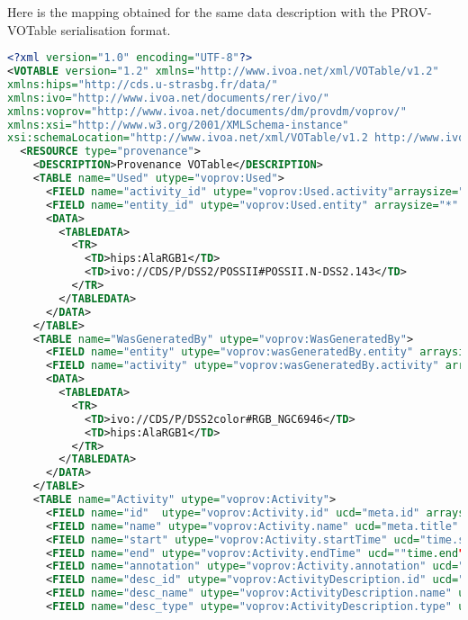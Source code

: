 Here is the mapping obtained for the same data description with the PROV-VOTable serialisation format.

\begin{lstlisting}[language=XML, caption= PROV-VOTable serialisation example for a color composition activity]
<?xml version="1.0" encoding="UTF-8"?>
<VOTABLE version="1.2" xmlns="http://www.ivoa.net/xml/VOTable/v1.2" 
xmlns:hips="http://cds.u-strasbg.fr/data/" 
xmlns:ivo="http://www.ivoa.net/documents/rer/ivo/" 
xmlns:voprov="http://www.ivoa.net/documents/dm/provdm/voprov/" 
xmlns:xsi="http://www.w3.org/2001/XMLSchema-instance" 
xsi:schemaLocation="http://www.ivoa.net/xml/VOTable/v1.2 http://www.ivoa.net/xml/VOTable/VOTable-1.2.xsd">
  <RESOURCE type="provenance">
    <DESCRIPTION>Provenance VOTable</DESCRIPTION>
    <TABLE name="Used" utype="voprov:Used">
      <FIELD name="activity_id" utype="voprov:Used.activity"arraysize="*" ucd="meta.id" datatype="char" />
      <FIELD name="entity_id" utype="voprov:Used.entity" arraysize="*" ucd="meta.id" datatype="char" />
      <DATA>
        <TABLEDATA>
          <TR>
            <TD>hips:AlaRGB1</TD>
            <TD>ivo://CDS/P/DSS2/POSSII#POSSII.N-DSS2.143</TD>
          </TR>
        </TABLEDATA>
      </DATA>
    </TABLE>
    <TABLE name="WasGeneratedBy" utype="voprov:WasGeneratedBy">
      <FIELD name="entity" utype="voprov:wasGeneratedBy.entity" arraysize="*" datatype="char"  ucd="meta.id"/>
      <FIELD name="activity" utype="voprov:wasGeneratedBy.activity" arraysize="*" datatype="char" ucd="meta.id"/>
      <DATA>
        <TABLEDATA>
          <TR>
            <TD>ivo://CDS/P/DSS2color#RGB_NGC6946</TD>
            <TD>hips:AlaRGB1</TD>
          </TR>
        </TABLEDATA>
      </DATA>
    </TABLE>
    <TABLE name="Activity" utype="voprov:Activity">
      <FIELD name="id"  utype="voprov:Activity.id" ucd="meta.id" arraysize="*" datatype="char" />
      <FIELD name="name" utype="voprov:Activity.name" ucd="meta.title" arraysize="*" datatype="char" />
      <FIELD name="start" utype="voprov:Activity.startTime" ucd="time.start" arraysize="*" datatype="char" />
      <FIELD name="end" utype="voprov:Activity.endTime" ucd=""time.end" arraysize="*" datatype="char"  "/>
      <FIELD name="annotation" utype="voprov:Activity.annotation" ucd="meta.description" arraysize="*" datatype="char" />
      <FIELD name="desc_id" utype="voprov:ActivityDescription.id" ucd="meta.id" arraysize="*" datatype="char" />
      <FIELD name="desc_name" utype="voprov:ActivityDescription.name" ucd="meta.title" arraysize="*" datatype="char" />
      <FIELD name="desc_type" utype="voprov:ActivityDescription.type" ucd="meta.code.class" arraysize="*" datatype="char" />

\end{lstlisting}
